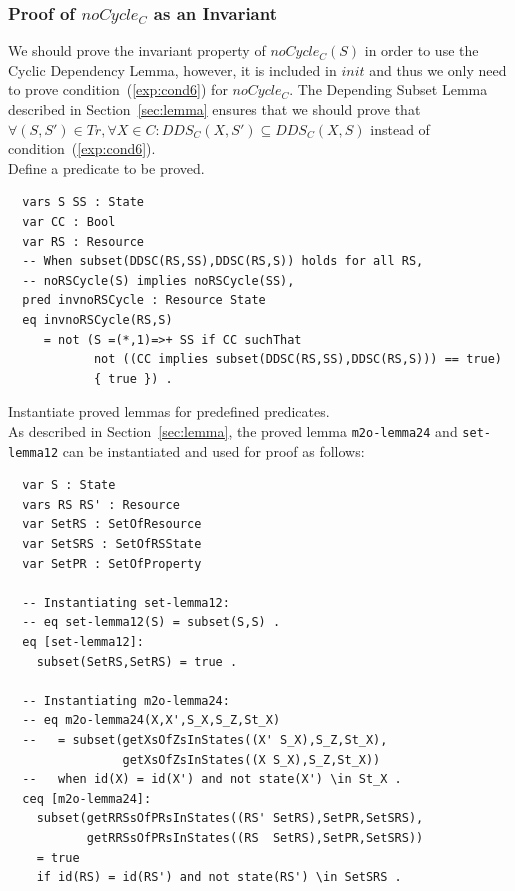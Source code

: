 \documentclass[12pt]{report}
\begin{document}
\subsubsection*{Proof of $noCycle_C$ as an Invariant}
We should prove the invariant property of $noCycle_C(S)$ in order to
use the Cyclic Dependency Lemma, however, it is included in $init$ and
thus we only need to prove condition~(\ref{exp:cond6}) for $noCycle_C$.
The Depending Subset Lemma described in Section~\ref{sec:lemma}
ensures that we should prove that $\forall (S,S') \in T\!r, \forall X\in
C:DDS\!_C(X,S')\subseteq DDS\!_C(X,S)$ instead of
condition~(\ref{exp:cond6}).\\

 Define a predicate to be proved. 
\small
\begin{verbatim}
  vars S SS : State
  var CC : Bool
  var RS : Resource
  -- When subset(DDSC(RS,SS),DDSC(RS,S)) holds for all RS,
  -- noRSCycle(S) implies noRSCycle(SS),
  pred invnoRSCycle : Resource State
  eq invnoRSCycle(RS,S) 
     = not (S =(*,1)=>+ SS if CC suchThat
            not ((CC implies subset(DDSC(RS,SS),DDSC(RS,S))) == true)
            { true }) .
\end{verbatim}
\normalsize

 Instantiate proved lemmas for predefined
predicates. \\ As described in Section~\ref{sec:lemma}, the proved
lemma {\tt m2o-lemma24} and {\tt set-lemma12} can be instantiated and
used for proof as follows:
\small
\begin{verbatim}
  var S : State
  vars RS RS' : Resource
  var SetRS : SetOfResource
  var SetSRS : SetOfRSState
  var SetPR : SetOfProperty

  -- Instantiating set-lemma12:
  -- eq set-lemma12(S) = subset(S,S) .
  eq [set-lemma12]:
    subset(SetRS,SetRS) = true .

  -- Instantiating m2o-lemma24:
  -- eq m2o-lemma24(X,X',S_X,S_Z,St_X)
  --   = subset(getXsOfZsInStates((X' S_X),S_Z,St_X),
                getXsOfZsInStates((X S_X),S_Z,St_X))
  --   when id(X) = id(X') and not state(X') \in St_X .
  ceq [m2o-lemma24]:
    subset(getRRSsOfPRsInStates((RS' SetRS),SetPR,SetSRS),
           getRRSsOfPRsInStates((RS  SetRS),SetPR,SetSRS))
    = true
    if id(RS) = id(RS') and not state(RS') \in SetSRS .
\end{verbatim}
\normalsize
\end{document}
